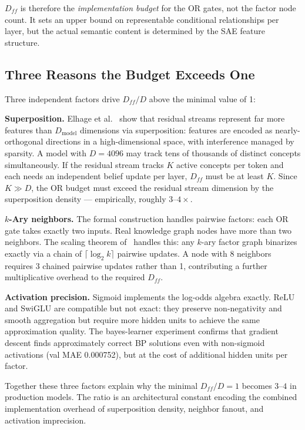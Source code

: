 $D_{ff}$ is therefore the \emph{implementation budget} for the OR gates, not the factor node
count. It sets an upper bound on representable conditional relationships per layer, but the
actual semantic content is determined by the SAE feature structure.

\subsection*{Three Reasons the Budget Exceeds One}

Three independent factors drive $D_{ff}/D$ above the minimal value of 1:

\textbf{Superposition.} Elhage et al.~\cite{elhage2022superposition} show that residual
streams represent far more features than $D_{\mathrm{model}}$ dimensions via superposition:
features are encoded as nearly-orthogonal directions in a high-dimensional space, with
interference managed by sparsity. A model with $D = 4096$ may track tens of thousands of
distinct concepts simultaneously. If the residual stream tracks $K$ active concepts per token
and each needs an independent belief update per layer, $D_{ff}$ must be at least $K$. Since
$K \gg D$, the OR budget must exceed the residual stream dimension by the superposition
density --- empirically, roughly $3$--$4\times$.

\textbf{$k$-Ary neighbors.} The formal construction handles pairwise factors: each OR gate
takes exactly two inputs. Real knowledge graph nodes have more than two neighbors. The scaling
theorem of~\cite{coppola2026transformers} handles this: any $k$-ary factor graph binarizes
exactly via a chain of $\lceil \log_2 k \rceil$ pairwise updates. A node with 8 neighbors
requires 3 chained pairwise updates rather than 1, contributing a further multiplicative
overhead to the required $D_{ff}$.

\textbf{Activation precision.} Sigmoid implements the log-odds algebra exactly. ReLU and
SwiGLU are compatible but not exact: they preserve non-negativity and smooth aggregation but
require more hidden units to achieve the same approximation quality. The bayes-learner
experiment confirms that gradient descent finds approximately correct BP solutions even with
non-sigmoid activations (val MAE 0.000752), but at the cost of additional hidden units per
factor.

Together these three factors explain why the minimal $D_{ff}/D = 1$ becomes $3$--$4$ in
production models. The ratio is an architectural constant encoding the combined implementation
overhead of superposition density, neighbor fanout, and activation imprecision.

